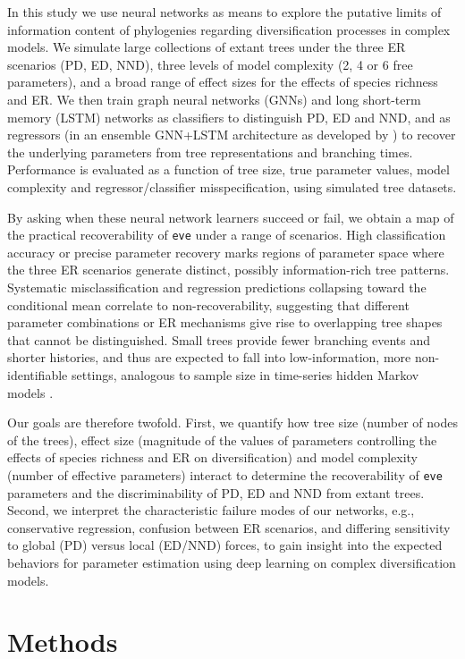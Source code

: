{In this study we use neural networks as means to explore the putative limits of information content of phylogenies regarding diversification processes in complex models. We simulate large collections of extant trees under the three ER scenarios (PD, ED, NND), three levels of model complexity (2, 4 or 6 free parameters), and a broad range of effect sizes for the effects of species richness and ER. We then train graph neural networks (GNNs) and long short-term memory (LSTM) networks as classifiers to distinguish PD, ED and NND, and as regressors (in an ensemble GNN+LSTM architecture as developed by \citet{qin_parameter_2025}) to recover the underlying parameters from tree representations and branching times. Performance is evaluated as a function of tree size, true parameter values, model complexity and regressor/classifier misspecification, using simulated tree datasets. 

By asking when these neural network learners succeed or fail, we obtain a map of the practical recoverability of \texttt{eve} under a range of scenarios. High classification accuracy or precise parameter recovery marks regions of parameter space where the three ER scenarios generate distinct, possibly information-rich tree patterns. Systematic misclassification and regression predictions collapsing toward the conditional mean correlate to non-recoverability, suggesting that different parameter combinations or ER mechanisms give rise to overlapping tree shapes that cannot be distinguished. Small trees provide fewer branching events and shorter histories, and thus are expected to fall into low-information, more non-identifiable settings, analogous to sample size in time-series hidden Markov models \citep{cole_parameter_2019}. 

Our goals are therefore twofold. First, we quantify how tree size (number of nodes of the trees), effect size (magnitude of the values of parameters controlling the effects of species richness and ER on diversification) and model complexity (number of effective parameters) interact to determine the recoverability of \texttt{eve} parameters and the discriminability of PD, ED and NND from extant trees. Second, we interpret the characteristic failure modes of our networks, e.g., conservative regression, confusion between ER scenarios, and differing sensitivity to global (PD) versus local (ED/NND) forces, to gain insight into the expected behaviors for parameter estimation using deep learning on complex diversification models.

\clearpage
\section{Methods}
\label{ch3::sec::methods}
}
